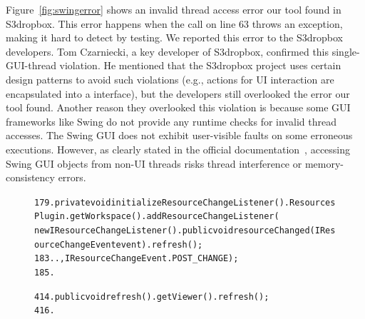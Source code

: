 Figure~\ref{fig:swingerror}
shows an invalid thread access error our tool found in S3dropbox.
This error happens when the 
call on line 63 throws an exception, making it hard to
detect by testing. We reported this error to the S3dropbox developers. Tom Czarniecki,
a key developer of S3dropbox, confirmed this single-GUI-thread
violation. He mentioned that the S3dropbox project uses
certain design patterns to avoid such violations (e.g.,
actions for UI interaction are encapsulated into a  interface),
but the developers still overlooked  the error our tool found.
Another reason they overlooked this violation is because some GUI frameworks like Swing
do not provide any runtime checks for invalid thread accesses. The Swing
GUI does not exhibit user-visible faults on some erroneous executions.
However, as clearly stated in the official documentation~\cite{swing}, %
accessing Swing GUI objects from non-UI threads risks thread interference
or memory-consistency errors.



\begin{figure}[t]
\hspace{4mm}{In class: com.eclipserunner.views.impl.RunnerView}
\vspace{-2mm}
\begin{CodeOut}
\begin{alltt} 
179.private void initializeResourceChangeListener() .  ResourcesPlugin.getWorkspace().addResourceChangeListener(
        new IResourceChangeListener() .      public void resourceChanged(IResourceChangeEvent event) .        refresh();
183.      .  \ttrcb, IResourceChangeEvent.POST\_CHANGE);
185.\ttrcb

414.public void refresh() .  getViewer().refresh();
416.\ttrcb
\end{alltt}
\end{CodeOut}
\vspace*{-15pt}
\end{figure}

